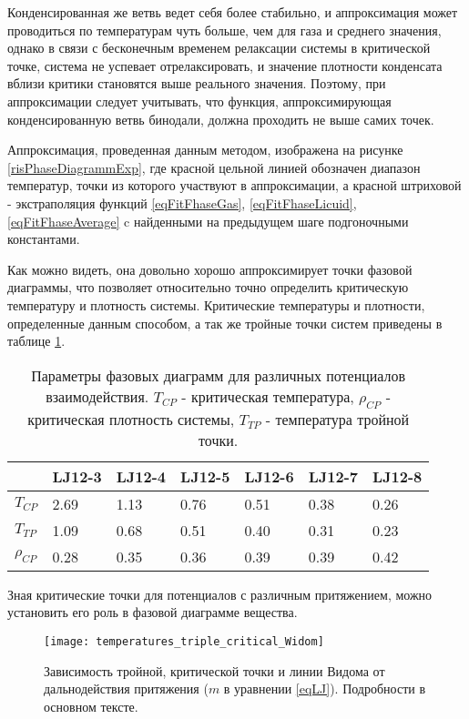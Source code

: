 Конденсированная же ветвь ведет себя более стабильно, и аппроксимация может проводиться по температурам чуть больше, чем для газа и среднего значения, однако в связи с бесконечным временем релаксации системы в критической точке, система не успевает отрелаксировать, и значение плотности конденсата вблизи критики становятся выше реального значения. Поэтому, при аппроксимации следует учитывать, что функция, аппроксимирующая конденсированную ветвь бинодали, должна проходить не выше самих точек.

Аппроксимация, проведенная данным методом, изображена на рисунке \ref{risPhaseDiagrammExp}, где красной цельной линией обозначен диапазон температур, точки из которого участвуют в аппроксимации, а красной штриховой - экстраполяция функций \ref{eqFitFhaseGas}, \ref{eqFitFhaseLicuid}, \ref{eqFitFhaseAverage} c найденными на предыдущем шаге подгоночными константами.

Как можно видеть, она довольно хорошо аппроксимирует точки фазовой диаграммы, что позволяет относительно точно определить критическую температуру и плотность системы.
Критические температуры и плотности, определенные данным способом, а так же тройные точки систем приведены в таблице \ref{tablSystemConst}.

\begin{table}[h]
\begin{center}
\begin{tabular}{| l | l | l | l | l | l | l |}
\hline
            & LJ12-3   & LJ12-4   & LJ12-5   & LJ12-6   & LJ12-7   & LJ12-8   \\ \hline
$T_{CP}$    & 2.69     &  1.13    &  0.76    &    0.51  & 0.38     & 0.26     \\ \hline
$T_{TP}$    & 1.09     & 0.68     & 0.51     & 0.40     & 0.31     & 0.23     \\ \hline
$\rho_{CP}$ & 0.28     &  0.35    &  0.36    &  0.39    & 0.39     & 0.42     \\ \hline
\end{tabular}
\end{center}
\caption{Параметры фазовых диаграмм для различных потенциалов взаимодействия. $T_{CP}$ - критическая температура, $\rho_{CP}$ - критическая плотность системы, $T_{TP}$ - температура тройной точки.}
\label{tablSystemConst}
\end{table}

Зная критические точки для потенциалов с различным притяжением, можно установить его роль в фазовой диаграмме вещества.

\begin{figure}[h]
\begin{center}
\texttt{[image: temperatures\_triple\_critical\_Widom]}
\caption{Зависимость тройной, критической точки и линии Видома от дальнодействия притяжения ($m$ в уравнении \ref{eqLJ}). Подробности в основном тексте.}
\label{risTcpTtpWlNoFrac}
\end{center}
\end{figure}

